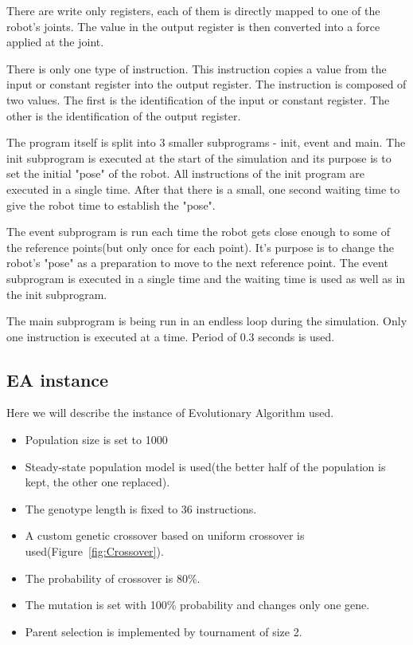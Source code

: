 \documentclass{ExcelAtFIT}
\begin{document}
There are write only registers, each of them is directly mapped to one of the robot's joints.
The value in the output register is then converted into a force applied at the joint.

There is only one type of instruction.
This instruction copies a value from the input or constant register into the output register.
The instruction is composed of two values.
The first is the identification of the input or constant register.
The other is the identification of the output register.

The program itself is split into 3 smaller subprograms - init, event and main.
The init subprogram is executed at the start of the simulation and its purpose is to set the initial "pose" of the robot.
All instructions of the init program are executed in a single time.
After that there is a small, one second waiting time to give the robot time to establish the "pose".

The event subprogram is run each time the robot gets close enough to some of the reference points(but only once for each point).
It's purpose is to change the robot's "pose" as a preparation to move to the next reference point.
The event subprogram is executed in a single time and the waiting time is used as well as in the init subprogram.

The main subprogram is being run in an endless loop during the simulation.
Only one instruction is executed at a time.
Period of 0.3 seconds is used.


\subsection{EA instance}
\label{sec:Experiment}
Here we will describe the instance of Evolutionary Algorithm used.
\begin{itemize}
	\item Population size is set to 1000
	\item Steady-state population model is used(the better half of the population is kept, the other one replaced).
	\item The genotype length is fixed to 36 instructions.
	\item A custom genetic crossover based on uniform crossover is used(Figure~\ref{fig:Crossover}).
	\item The probability of crossover is 80\%.
	\item The mutation is set with 100\% probability and changes only one gene.
	\item Parent selection is implemented by tournament of size 2.
\end{itemize}
\end{document}
